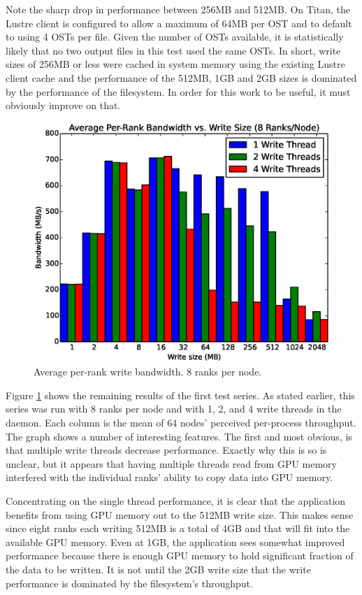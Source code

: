 Note the sharp drop in performance between 256MB and 512MB.  On Titan, the Lustre client is configured to allow a maximum of 64MB per OST and to default to using 4 OSTs per file.  Given the number of OSTs available, it is statistically likely that no two output files in this test used the same OSTs.  In short, write sizes of 256MB or less were cached in system memory using the existing Lustre client cache and the performance of the 512MB, 1GB and 2GB sizes is dominated by the performance of the filesystem.  In order for this work to be useful, it must obviously improve on that.

\begin{figure}
\includegraphics[width=\linewidth]{figures/figure_2.eps}
\caption{Average per-rank write bandwidth.  8 ranks per node.} 
\label{fig:results_8_nobars}
\end{figure}

Figure \ref{fig:results_8_nobars} shows the remaining results of the first test series.  As stated earlier, this series was run with 8 ranks per node and with 1, 2, and 4 write threads in the daemon. Each column is the mean of 64 nodes' perceived per-process throughput. The graph shows a number of interesting features.  The first and most obvious, is that multiple write threads decrease performance.  Exactly why this is so is unclear, but it appears that having multiple threads read from GPU memory interfered with the individual ranks' ability to copy data into GPU memory.  

Concentrating on the single thread performance, it is clear that the application benefits from using GPU memory out to the 512MB write size.  This makes sense since eight ranks each writing 512MB is a total of 4GB and that will fit into the available GPU memory.  Even at 1GB, the application sees somewhat improved performance because there is enough GPU memory to hold significant fraction of the data to be written.  It is not until the 2GB write size that the write performance is dominated by the filesystem's throughput.

